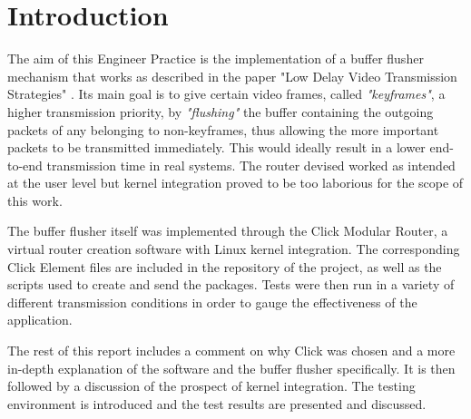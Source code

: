 \chapter{Introduction}
\setcounter{page}{1}
\thispagestyle{empty}

The aim of this Engineer Practice is the implementation of a buffer flusher mechanism that works as described in the paper "Low Delay Video Transmission Strategies" \cite{Bachhuber}. Its main goal is to give certain video frames, called \textit{"keyframes"}, a higher transmission priority, by \textit{"flushing"} the buffer containing the outgoing packets of any belonging to non-keyframes, thus allowing the more important packets to be transmitted immediately. This would ideally result in a lower end-to-end transmission time in real systems. The router devised worked as intended at the user level but kernel integration proved to be too laborious for the scope of this work.

The buffer flusher itself was implemented through the Click Modular Router, a virtual router creation software with Linux kernel integration. The corresponding Click Element files are included in the repository of the project, as well as the scripts used to create and send the packages. Tests were then run in a variety of different transmission conditions in order to gauge the effectiveness of the application.

The rest of this report includes a comment on why Click was chosen and a more in-depth explanation of the software and the buffer flusher specifically. It is then followed by a discussion of the prospect of kernel integration. The testing environment is introduced and the test results are presented and discussed.

